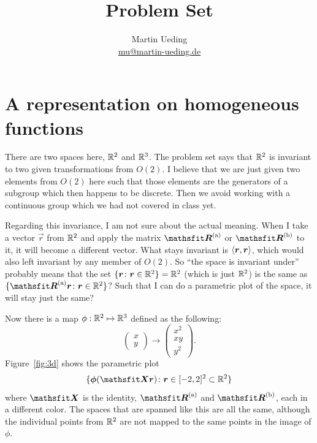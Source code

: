 \documentclass[11pt, english, fleqn, DIV=15, headinclude, BCOR=1cm]{scrartcl}
\title{Problem Set \arabic{problemset}}
\author{
    Martin Ueding \\ \small{\href{mailto:mu@martin-ueding.de}{mu@martin-ueding.de}}
}
\begin{document}
\maketitle

\section{A representation on homogeneous functions}

\newcommand\Ra{\tens R^{(\text a)}}
\newcommand\Rb{\tens R^{(\text b)}}

There are two spaces here, $\mathbb R^2$ and $\mathbb R^3$. The problem set says that $\mathbb R^2$
is invariant to two given transformations from $O(2)$. I believe that we are
just given two elements from $O(2)$ here such that those elements are the
generators of a subgroup which then happens to be discrete. Then we avoid
working with a continuous group which we had not covered in class yet.

Regarding this invariance, I am not sure about the actual meaning. When I take
a vector $\vec r$ from $\mathbb R^2$ and apply the matrix $\Ra$ or $\Rb$ to it, it
will become a different vector. What stays invariant is $\langle \boldsymbol{r}, \boldsymbol{r} \rangle$, which would also left invariant by any member of $O(2)$. So “the space is
invariant under” probably means that the set $\{ \boldsymbol{r} \colon \boldsymbol{r} \in
\mathbb R^2\} = \mathbb R^2$ (which is just $\mathbb R^2$) is the same as $\{ \Ra \vec r \colon \vec
r \in \R^2\}$? Such that I can do a parametric plot of the space, it will stay
just the same?

Now there is a map $\phi: \mathbb R^2 \mapsto \mathbb R^3$ defined as the following:
\[
    \begin{pmatrix}
        x \\ y
    \end{pmatrix}
    \to
    \begin{pmatrix}
        x^2 \\ xy \\ y^2
    \end{pmatrix}.
\]
Figure~\ref{fig:3d} shows the parametric plot
\[
    \{ \vec \phi(\tens X \vec r) \colon \vec r \in [-2,2]^2 \subset \R^2 \}
\]
where $\tens X$ is the identity, $\Ra$ and $\Rb$, each in a different color.
The spaces that are spanned like this are all the same, although the individual
points from $\mathbb R^2$ are not mapped to the same points in the image of $\phi$.
\end{document}
